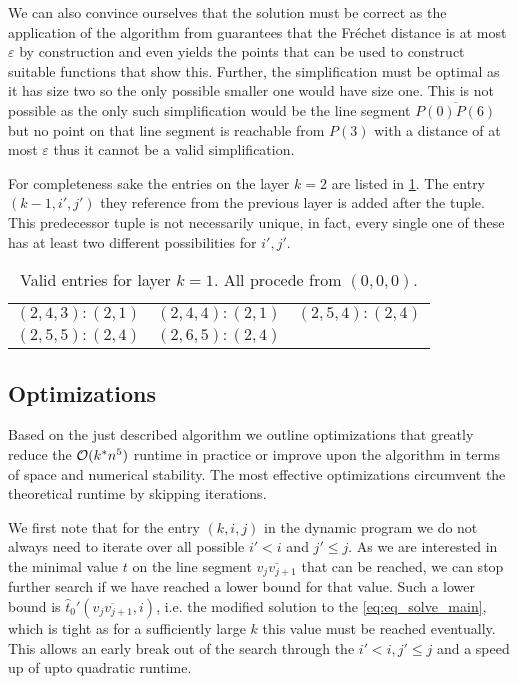 We can also convince ourselves that the solution must be correct as the application of the algorithm from \citeauthor{computing_the_frechet_distance_between_two_polygonal_curves} guarantees that the Fréchet distance is at most \(\varepsilon\) by construction and even yields the points that can be used to construct suitable functions that show this. Further, the simplification must be optimal as it has size two so the only possible smaller one would have size one. This is not possible as the only such simplification would be the line segment \(\overline{P(0)P(6)}\) but no point on that line segment is reachable from \(P(3)\) with a distance of at most \(\varepsilon\) thus it cannot be a valid simplification.

For completeness sake the entries on the layer \(k = 2\) are listed in \cref{tab:exlayer2}. The entry \((k - 1, i', j')\) they reference from the previous layer is added after the tuple. This predecessor tuple is not necessarily unique, in fact, every single one of these has at least two different possibilities for \(i', j'\).
\begin{table}[ht]
\centering
\begin{tabular}{|ccc|}
\hline
$(2,4,3):(2, 1)$ & $(2,4,4):(2, 1)$ & $(2,5,4):(2,4)$ \\
$(2,5,5):(2,4)$ & $(2,6,5):(2,4)$ & \\
\hline
\end{tabular}
\caption{Valid entries for layer \(k = 1\). All procede from \((0,0,0)\).}
\label{tab:exlayer2}
\end{table}

\subsection{Optimizations}
\label{ssec:optimizations}
Based on the just described algorithm we outline optimizations that greatly reduce the \(\mathcal{O}(k^*n^5)\) runtime in practice or improve upon the algorithm in terms of space and numerical stability. The most effective optimizations circumvent the theoretical runtime by skipping iterations. 

We first note that for the entry \((k, i, j)\) in the dynamic program we do not always need to iterate over all possible \(i' < i\) and \(j' \leq j\). As we are interested in the minimal value \(t\) on the line segment \(\overline{v_{j}v_{j+1}}\) that can be reached, we can stop further search if we have reached a lower bound for that value. Such a lower bound is \(\hat t_0'(\overline{v_{j}v_{j+1}}, i)\), i.e. the modified solution to the \cref{eq:eq_solve_main}, which is tight as for a sufficiently large \(k\) this value must be reached eventually. This allows an early break out of the search through the \(i' < i, j'\leq j\) and a speed up of upto quadratic runtime. 

